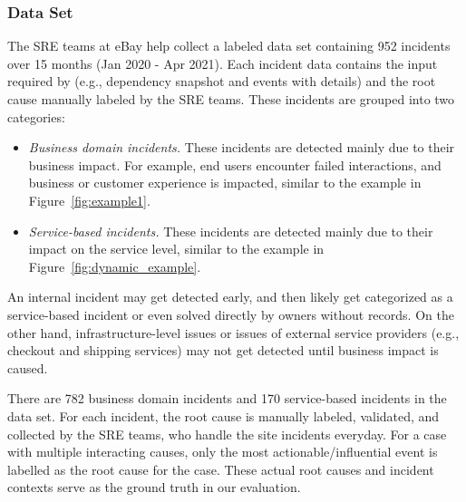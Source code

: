 \subsubsection{Data Set}
\label{sec:dataset}
The SRE teams at eBay help collect a labeled data set containing 952 incidents over 15 months (Jan 2020 - Apr 2021). Each incident data contains the input required by \system (e.g., dependency snapshot and events with details) and the root cause manually labeled by the SRE teams. %
These incidents are grouped into two categories: 
\begin{itemize}
\item \emph{Business domain incidents.} These incidents are detected mainly due to their business impact. For example, end users encounter failed interactions, and business or customer experience is impacted, similar to the example in  Figure~\ref{fig:example1}. 
\item \emph{Service-based incidents.} These incidents are detected mainly due to their impact on the service level, similar to the example in Figure~\ref{fig:dynamic_example}.
\end{itemize}

An internal incident may get detected early, and then likely get categorized as a service-based incident or even solved directly by owners without records. On the other hand, infrastructure-level issues or issues of external service providers (e.g., checkout and shipping services) may not get detected until business impact is caused. 

There are 782 business domain incidents and 170 service-based incidents in the data set. For each incident, the root cause is manually labeled, validated, and collected by the SRE teams, who handle the site incidents everyday. For a case with multiple interacting causes, only the most actionable/influential event is labelled as the root cause for the case. These actual root causes and incident contexts serve as the ground truth in our evaluation.


